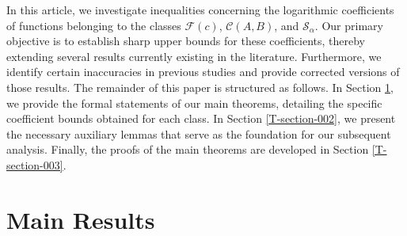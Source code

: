 \documentclass[a4paper,12pt]{amsart}
\theoremstyle{definition}
\begin{document}


In this article, we investigate inequalities concerning the logarithmic coefficients of functions belonging to the classes $\mathcal{F}(c)$, $\mathcal{C}(A,B)$, and $\mathcal{S}_\alpha$. Our primary objective is to establish sharp upper bounds for these coefficients, thereby extending several results currently existing in the literature. Furthermore, we identify certain inaccuracies in previous studies and provide corrected versions of those results. The remainder of this paper is structured as follows. In Section \ref{T-section-001}, we provide the formal statements of our main theorems, detailing the specific coefficient bounds obtained for each class. In Section \ref{T-section-002}, we present the necessary auxiliary lemmas that serve as the foundation for our subsequent analysis. Finally, the proofs of the main theorems are developed in Section \ref{T-section-003}.





\section{Main Results}\label{T-section-001}
\end{document}
